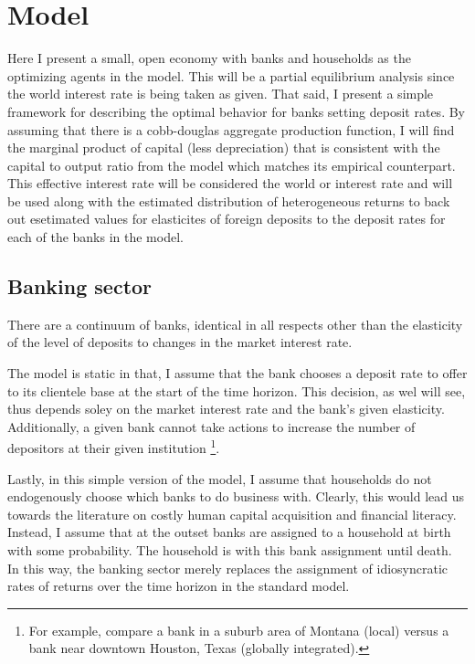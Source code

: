 \onlyinsubfile{\setcounter{section}{3}}
\section{Model}
\notinsubfile{\label{sec:Model}}

\par Here I present a small, open economy with banks and households as the optimizing agents in the model. This will be a partial equilibrium analysis since the world interest rate is being taken as given. That said, I present a simple framework for describing the optimal behavior for banks setting deposit rates. By assuming that there is a cobb-douglas aggregate production function, I will find the marginal product of capital (less depreciation) that is consistent with the capital to output ratio from the model which matches its empirical counterpart. This effective interest rate will be considered the world or  interest rate and will be used along with the estimated distribution of heterogeneous returns to back out esetimated values for elasticites of foreign deposits to the deposit rates for each of the banks in the model.  

\subsection{Banking sector}

\par There are a continuum of banks, identical in all respects other than the elasticity of the level of deposits to changes in the market interest rate.

\par The model is static in that, I assume that the bank chooses a deposit rate to offer to its clientele base at the start of the time horizon. This decision, as wel will see, thus depends soley on the market interest rate and the bank's given elasticity. Additionally, a given bank cannot take actions to increase the number of depositors at their given institution \footnote{For example, compare a bank in a suburb area of Montana (local) versus a bank near downtown Houston, Texas (globally integrated).}.

\par Lastly, in this simple version of the model, I assume that households do not endogenously choose which banks to do business with. Clearly, this would lead us towards the literature on costly human capital acquisition and financial literacy. Instead, I assume that at the outset banks are assigned to a household at birth with some probability. The household is  with this bank assignment until death. In this way, the banking sector merely replaces the assignment of idiosyncratic rates of returns over the time horizon in the standard model. 

